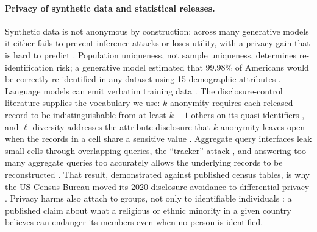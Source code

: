 \documentclass[11pt]{article}
\begin{document}
\paragraph{Privacy of synthetic data and statistical releases.} Synthetic data is not anonymous by construction: across many generative models it either fails to prevent inference attacks or loses utility, with a privacy gain that is hard to predict \citep{stadler2022groundhog}. Population uniqueness, not sample uniqueness, determines re-identification risk; a generative model estimated that 99.98\% of Americans would be correctly re-identified in any dataset using 15 demographic attributes \citep{rocher2019reidentification}. Language models can emit verbatim training data \citep{carlini2021extracting}. The disclosure-control literature supplies the vocabulary we use: $k$-anonymity requires each released record to be indistinguishable from at least $k-1$ others on its quasi-identifiers \citep{sweeney2002kanonymity}, and $\ell$-diversity addresses the attribute disclosure that $k$-anonymity leaves open when the records in a cell share a sensitive value \citep{machanavajjhala2007ldiversity}. Aggregate query interfaces leak small cells through overlapping queries, the ``tracker'' attack \citep{denning1979tracker}, and answering too many aggregate queries too accurately allows the underlying records to be reconstructed \citep{dinur2003revealing}. That result, demonstrated against published census tables, is why the US Census Bureau moved its 2020 disclosure avoidance to differential privacy \citep{abowd2018census,garfinkel2019reconstruction}. Privacy harms also attach to groups, not only to identifiable individuals \citep{taylor2017group}: a published claim about what a religious or ethnic minority in a given country believes can endanger its members even when no person is identified.
\end{document}
